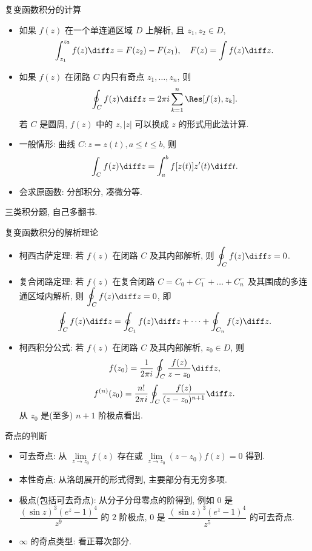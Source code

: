 \documentclass[aspectratio=169,handout]{ctexbeamer}
\begin{document}
\begin{frame}{复变函数积分的计算}
	\beqskip{3pt}
	\begin{itemize}
		\item 如果 $f(z)$ 在一个单连通区域 $D$ 上解析, 且 $z_1,z_2\in D$,
		\[
			\int_{z_1}^{z_2}f(z)\diff z=F(z_2)-F(z_1),\quad
			F(z)=\int f(z)\diff z.
		\]
		\item 如果 $f(z)$ 在闭路 $C$ 内只有奇点 $z_1,\dots,z_n$, 则
		\[
			\oint_C f(z)\diff z=2\pi i\sum_{k=1}^n\Res[f(z),z_k].
		\]
		若 $C$ 是圆周, $f(z)$ 中的 $z,|z|$ 可以换成 $z$ 的形式用此法计算.
		\item 一般情形: 曲线 $C:z=z(t),a\le t\le b$, 则
		\[
			\int_C f(z)\diff z=\int_a^b f[z(t)]z'(t)\diff t.
		\]
		\item 会求原函数: 分部积分, 凑微分等.
	\end{itemize}
	\onslide<+->
	\begin{exercise}
		三类积分题, 自己多翻书.
	\end{exercise}
	\endgroup
\end{frame}


\begin{frame}{复变函数积分的解析理论}
	\begin{itemize}
		\item 柯西古萨定理: 若 $f(z)$ 在闭路 $C$ 及其内部解析, 则 $\displaystyle\oint_Cf(z)\diff z=0$.
		\item 复合闭路定理: 若 $f(z)$ 在复合闭路 $C=C_0+C_1^-+\dots+C_n^-$ 及其围成的多连通区域内解析, 则 $\displaystyle\oint_Cf(z)\diff z=0$, 即
		\[
			\oint_Cf(z)\diff z=\oint_{C_1}f(z)\diff z+\cdots+\oint_{C_n}f(z)\diff z.
		\]
		\item 柯西积分公式: 若 $f(z)$ 在闭路 $C$ 及其内部解析, $z_0\in D$, 则
		\[
			f(z_0)=\frac{1}{2\pi i}\oint_C\frac{f(z)}{z-z_0}\diff z,
		\]
		\[
			f^{(n)}(z_0)=\frac{n!}{2\pi i}\oint_C\frac{f(z)}{(z-z_0)^{n+1}}\diff z.
		\]
		从 $z_0$ 是(至多) $n+1$ 阶极点看出.
	\end{itemize}
\end{frame}


\begin{frame}{奇点的判断}
	\begin{itemize}
		\item 可去奇点: 从 $\lim\limits_{z\to z_0}f(z)$ 存在或 $\lim\limits_{z\to z_0}(z-z_0)f(z)=0$ 得到.
		\item 本性奇点: 从洛朗展开的形式得到, 主要部分有无穷多项.
		\item 极点(包括可去奇点): 从分子分母零点的阶得到, 例如
		$0$ 是 $\dfrac{(\sin z)^3(e^z-1)^4}{z^9}$ 的 $2$ 阶极点,
		$0$ 是 $\dfrac{(\sin z)^3(e^z-1)^4}{z^5}$ 的可去奇点.
		\item $\infty$ 的奇点类型: 看正幂次部分.
	\end{itemize}
\end{frame}
\end{document}
